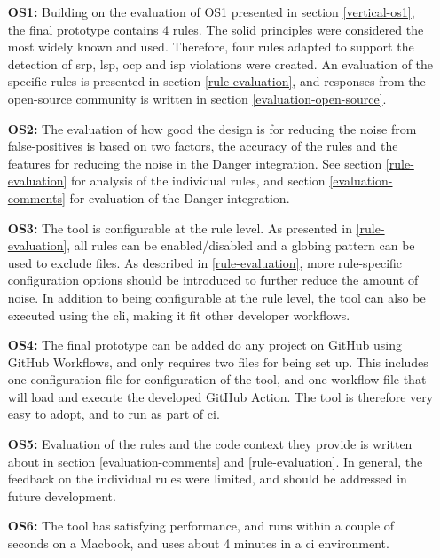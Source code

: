 \documentclass{report}
\begin{document}
\begin{itemize}
    \item [\textbf{OS1:}] Building on the evaluation of OS1 presented in section \ref{vertical-os1}, the final prototype contains 4 rules. The \gls{solid} principles were considered the most widely known and used. Therefore, four rules adapted to support the detection of \gls{srp}, \gls{lsp}, \gls{ocp} and \gls{isp} violations were created. An evaluation of the specific rules is presented in section \ref{rule-evaluation}, and responses from the open-source community is written in section \ref{evaluation-open-source}. 
    
    \item [\textbf{OS2:}] The evaluation of how good the design is for reducing the noise from false-positives is based on two factors, the accuracy of the rules and the features for reducing the noise in the Danger integration. See section \ref{rule-evaluation} for analysis of the individual rules, and section \ref{evaluation-comments} for evaluation of the Danger integration. 
    
    \item [\textbf{OS3:}] The tool is configurable at the rule level. As presented in \ref{rule-evaluation}, all rules can be enabled/disabled and a globing pattern can be used to exclude files. As described in \ref{rule-evaluation}, more rule-specific configuration options should be introduced to further reduce the amount of noise. In addition to being configurable at the rule level, the tool can also be executed using the \gls{cli}, making it fit other developer workflows. 
    
    \item [\textbf{OS4:}] The final prototype can be added do any project on GitHub using GitHub Workflows, and only requires two files for being set up. This includes one configuration file for configuration of the tool, and one workflow file that will load and execute the developed GitHub Action. The tool is therefore very easy to adopt, and to run as part of \gls{ci}.
    
    \item [\textbf{OS5:}] Evaluation of the rules and the code context they provide is written about in section \ref{evaluation-comments} and \ref{rule-evaluation}. In general, the feedback on the individual rules were limited, and should be addressed in future development. 
    
    \item [\textbf{OS6:}] The tool has satisfying performance, and runs within a couple of seconds on a Macbook, and uses about 4 minutes in a \gls{ci} environment.
\end{itemize}
\end{document}
